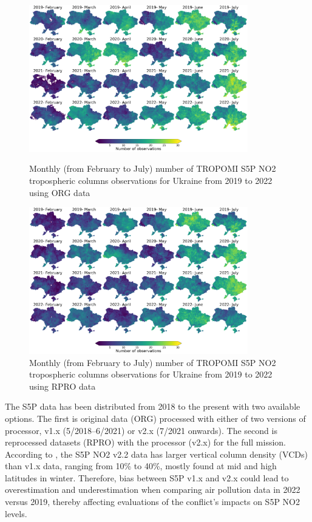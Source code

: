 \begin{figure}[p]
    \centering
    \includegraphics[width=0.85\textwidth]{figs/chap3/fig2_a.png}
    \caption{Monthly (from February to July) number of TROPOMI S5P NO2 tropospheric columns observations for Ukraine from 2019 to 2022 using ORG data}
    \label{fig:chap3_fig2a}
    \includegraphics[width=0.85\textwidth]{figs/chap3/fig2_b.png}
    \caption{Monthly (from February to July) number of TROPOMI S5P NO2 tropospheric columns observations for Ukraine from 2019 to 2022 using RPRO data}
    \label{fig:chap3_fig2b}
\end{figure}

The S5P data has been distributed from 2018 to the present with two available options. The first is original data (ORG) processed with either of two versions of processor, v1.x (5/2018–6/2021) or v2.x (7/2021 onwards). The second is reprocessed datasets (RPRO) with the processor (v2.x) for the full mission. According to \citep{van2022sentinel}, the S5P NO2 v2.2 data has larger vertical column density (VCDs) than v1.x data, ranging from 10\% to 40\%, mostly found at mid and high latitudes in winter. Therefore, bias between S5P v1.x and v2.x could lead to overestimation and underestimation when comparing air pollution data in 2022 versus 2019, thereby affecting evaluations of the conflict’s impacts on S5P NO2 levels.\par

